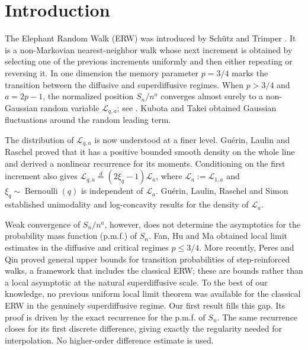 \documentclass[11pt]{article}
\numberwithin{equation}{section}
\theoremstyle{remark}
\begin{document}
\section{Introduction}

The Elephant Random Walk (ERW) was introduced by Sch\"utz and Trimper
\cite{schutz-trimper}. It is a non-Markovian nearest-neighbor walk whose next
increment is obtained by selecting one of the previous increments uniformly and
then either repeating or reversing it. In one dimension the memory parameter
$p=3/4$ marks the transition between the diffusive and superdiffusive regimes.
When $p>3/4$ and $a=2p-1$, the normalized position $S_n/n^a$ converges almost
surely to a non-Gaussian random variable $\mathcal{L}_{q,a}$; see
\cite{baur-bertoin,bercu}. Kubota and Takei \cite{kubota-takei} obtained Gaussian
fluctuations around the random leading term.

The distribution of $\mathcal{L}_{q,a}$ is now understood at a finer level. Gu\'erin,
Laulin and Raschel \cite[Theorems 1.3 and 1.4]{guerin-laulin-raschel} proved that
it has a positive bounded smooth density on the whole line and derived a nonlinear
recurrence for its moments. Conditioning on the first increment also gives
$\mathcal{L}_{q,a}\stackrel{d}{=}(2\xi_q-1)\mathcal{L}_a$, where $\mathcal{L}_a:=\mathcal{L}_{1,a}$ and
$\xi_q\sim\operatorname{Bernoulli}(q)$ is independent of $\mathcal{L}_a$. Gu\'erin, Laulin,
Raschel and Simon \cite[Theorem 1.1, Proposition 2.2 and Corollary 2.4]
{guerin-laulin-raschel-simon} established unimodality and log-concavity results for the density of $\mathcal{L}_a$.

Weak convergence of $S_n/n^a$, however, does not determine the asymptotics for the probability mass function (p.m.f.) of $S_n$. Fan, Hu and Ma \cite{fan-hu-ma} obtained local limit
estimates in the diffusive and critical regimes $p\leq3/4$. More recently,
Peres and Qin \cite{peres-qin} proved general upper bounds for transition
probabilities of step-reinforced walks, a framework that includes the classical
ERW; these are bounds rather than a local asymptotic at the
natural superdiffusive scale. To the best of our knowledge, no previous uniform
local limit theorem was available for the classical ERW in the genuinely
superdiffusive regime. Our first result fills this gap. Its proof is driven by the exact recurrence for the
p.m.f. of $S_n$. The same recurrence closes for its first discrete difference,
giving exactly the regularity needed for interpolation. No higher-order difference
estimate is used.
\end{document}
